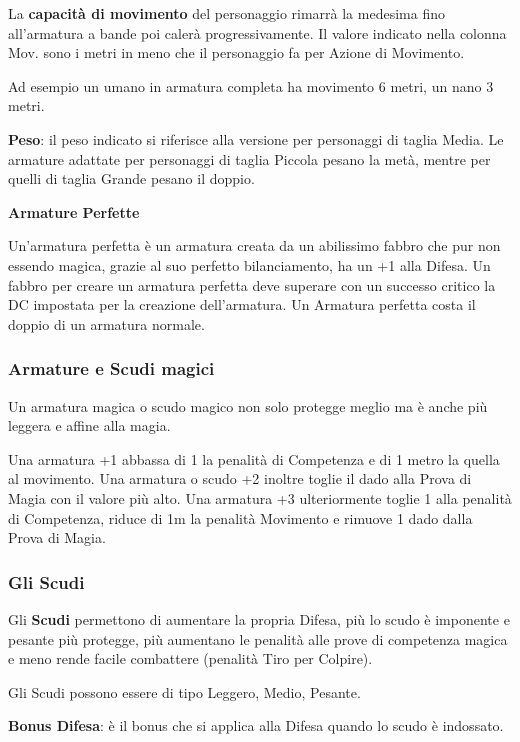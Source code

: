 \begin{multicols}{2}
La \textbf{capacità di movimento} del personaggio rimarrà la medesima fino all'armatura a bande poi calerà progressivamente. Il valore indicato nella colonna Mov. sono i metri in meno che il personaggio fa per Azione di Movimento.

Ad esempio un umano in armatura completa ha movimento 6 metri, un nano 3 metri.

\textbf{Peso}: il peso indicato si riferisce alla versione per personaggi di taglia Media. Le armature adattate per personaggi di taglia Piccola pesano la metà, mentre per quelli di taglia Grande pesano il doppio.

\textbf{Armature Perfette}

Un'armatura perfetta è un armatura creata da un abilissimo fabbro che pur non essendo magica, grazie al suo perfetto bilanciamento, ha un +1 alla Difesa. Un fabbro per creare un armatura perfetta deve superare con un successo critico la DC impostata per la creazione dell'armatura. Un Armatura perfetta costa il doppio di un armatura normale.

\subsubsection{Armature e Scudi magici}

Un armatura magica o scudo magico non solo protegge meglio ma è anche più leggera e affine alla magia.

Una armatura +1 abbassa di 1 la penalità di Competenza e di 1 metro la quella al movimento.
Una armatura o scudo +2 inoltre toglie il dado alla Prova di Magia con il valore più alto. Una armatura +3 ulteriormente toglie 1 alla penalità di Competenza, riduce di 1m la penalità Movimento e rimuove 1 dado dalla Prova di Magia.


\subsubsection{Gli Scudi}

Gli \textbf{Scudi} permettono di aumentare la propria Difesa, più lo scudo è imponente e pesante più protegge, più aumentano le penalità alle prove di competenza magica e meno rende facile combattere (penalità Tiro per Colpire).

Gli Scudi possono essere di tipo Leggero, Medio, Pesante.

\textbf{Bonus Difesa}: è il bonus che si applica alla Difesa quando lo scudo è indossato.


\end{multicols}
